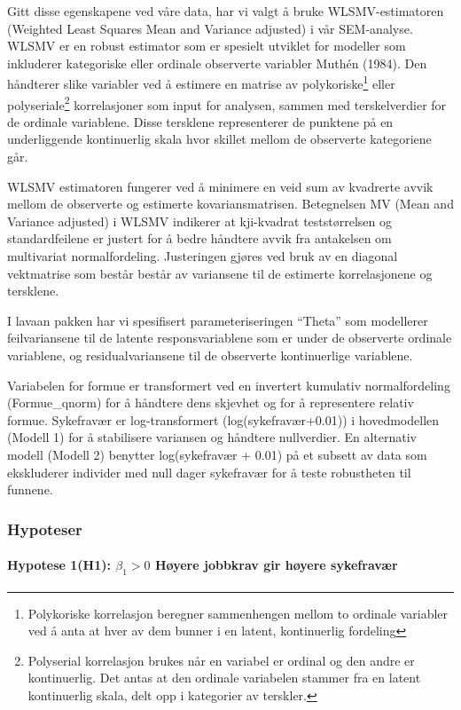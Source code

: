 \documentclass[
  12pt,
  a4paper,
  DIV=11,
  numbers=noendperiod]{scrartcl}
\let\oldparagraph\paragraph
\renewcommand{\paragraph}[1]{\oldparagraph{#1}\mbox{}}
\begin{document}
Gitt disse egenskapene ved våre data, har vi valgt å bruke
WLSMV-estimatoren (Weighted Least Squares Mean and Variance adjusted) i
vår SEM-analyse. WLSMV er en robust estimator som er spesielt utviklet
for modeller som inkluderer kategoriske eller ordinale observerte
variabler Muthén (1984). Den håndterer slike variabler ved å estimere en
matrise av polykoriske\footnote{Polykoriske korrelasjon beregner
  sammenhengen mellom to ordinale variabler ved å anta at hver av dem
  bunner i en latent, kontinuerlig fordeling} eller
polyseriale\footnote{Polyserial korrelasjon brukes når en variabel er
  ordinal og den andre er kontinuerlig. Det antas at den ordinale
  variabelen stammer fra en latent kontinuerlig skala, delt opp i
  kategorier av terskler.} korrelasjoner som input for analysen, sammen
med terskelverdier for de ordinale variablene. Disse tersklene
representerer de punktene på en underliggende kontinuerlig skala hvor
skillet mellom de observerte kategoriene går.

WLSMV estimatoren fungerer ved å minimere en veid sum av kvadrerte avvik
mellom de observerte og estimerte kovariansmatrisen. Betegnelsen MV
(Mean and Variance adjusted) i WLSMV indikerer at kji-kvadrat
teststørrelsen og standardfeilene er justert for å bedre håndtere avvik
fra antakelsen om multivariat normalfordeling. Justeringen gjøres ved
bruk av en diagonal vektmatrise som består består av variansene til de
estimerte korrelasjonene og tersklene.

I lavaan pakken har vi spesifisert parameteriseringen ``Theta'' som
modellerer feilvariansene til de latente responsvariablene som er under
de observerte ordinale variablene, og residualvariansene til de
observerte kontinuerlige variablene.

Variabelen for formue er transformert ved en invertert kumulativ
normalfordeling (Formue\_qnorm) for å håndtere dens skjevhet og for å
representere relativ formue. Sykefravær er log-transformert
(log(sykefravær+0.01)) i hovedmodellen (Modell 1) for å stabilisere
variansen og håndtere nullverdier. En alternativ modell (Modell 2)
benytter log(sykefravær + 0.01) på et subsett av data som ekskluderer
individer med null dager sykefravær for å teste robustheten til funnene.

\subsubsection{Hypoteser}\label{sec-hypot}

\paragraph{\texorpdfstring{Hypotese 1(H1): \(\beta_1 > 0\) Høyere
jobbkrav gir høyere
sykefravær}{Hypotese 1(H1): \textbackslash beta\_1 \textgreater{} 0 Høyere jobbkrav gir høyere sykefravær}}\label{hypotese-1h1-beta_1-0-huxf8yere-jobbkrav-gir-huxf8yere-sykefravuxe6r}
\end{document}
